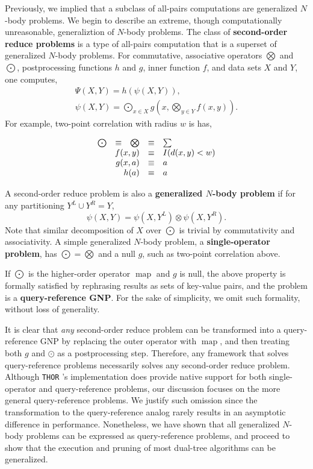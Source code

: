 \documentclass[twoside,leqno,twocolumn]{article}
\newcommand{\THOR}{{{\tt THOR}} }
\newcommand{\union}{\cup}
\DeclareMathOperator*{\map}{map}
\newcommand{\Gnp}{\Psi}
\newcommand{\gnp}{\psi}
\newcommand{\defterm}[1]{{\bf #1}}
\newcommand{\kdleft}[1]{#1^{\!L}}
\newcommand{\kdright}[1]{#1^{\!R}}
\begin{document}
Previously, we implied that a subclass of all-pairs computations are generalized $N$-body problems.
We begin to describe an extreme, though computationally unreasonable, generaliztion of $N$-body problems.
The class of \defterm{second-order reduce problems} is a type of all-pairs computation that is a superset of generalized $N$-body problems.
For commutative, associative operators $\bigotimes$ and $\bigodot$, postprocessing functions $h$ and $g$, inner function $f$, and data sets $X$ and $Y$, one computes,
\[\begin{array}{l}
  \displaystyle \Gnp(X, Y) = h(\gnp(X, Y)),
  \\
  \displaystyle \gnp(X, Y) = \bigodot_{x \in X} g\!\left(x, \bigotimes_{y \in Y} f(x, y) \right).
\end{array}\]
\noindent
For example, two-point correlation with radius $w$ is has,

\[\begin{array}{ccccl}
  \bigodot &\equiv& \bigotimes &\equiv& \sum
  \\
  \multicolumn{3}{r}{f(x,y)} &\equiv& I(d(x,y) < w)
  \\
  \multicolumn{3}{r}{g(x, a)} &\equiv& a
  \\
  \multicolumn{3}{r}{h(a)} &\equiv& a
\end{array}\]

A second-order reduce problem is also a \defterm{generalized $N$-body problem} if for any partitioning $\kdleft{Y} \union \kdright{Y} = Y$,
\[\gnp(X,Y) = \gnp(X,\kdleft{Y}) \otimes \gnp(X,\kdright{Y}).\]
\noindent Note that similar decomposition of $X$ over $\bigodot$ is trivial by commutativity and associativity.
A simple generalized $N$-body problem, a \defterm{single-operator problem}, has $\bigodot = \bigotimes$ and a null $g$, such as two-point correlation above.

If $\bigodot$ is the higher-order operator $\map$ and $g$ is null, the above property is formally satisfied by rephrasing results as sets of key-value pairs, and the problem is a \defterm{query-reference GNP}.
For the sake of simplicity, we omit such formality, without loss of generality.

It is clear that {\em any} second-order reduce problem can be transformed into a query-reference GNP by replacing the outer operator with $\map$, and then treating both $g$ and $\odot$ as a postprocessing step.
Therefore, any framework that solves query-reference problems necessarily solves any second-order reduce problem.
Although \THOR's implementation does provide native support for both single-operator and query-reference problems, our discussion focuses on the more general query-reference problems.
We justify such omission since the transformation to the query-reference analog rarely results in an asymptotic difference in performance.
Nonetheless, we have shown that all generalized $N$-body problems can be expressed as query-reference problems, and proceed to show that the execution and pruning of most dual-tree algorithms can be generalized.
\end{document}
